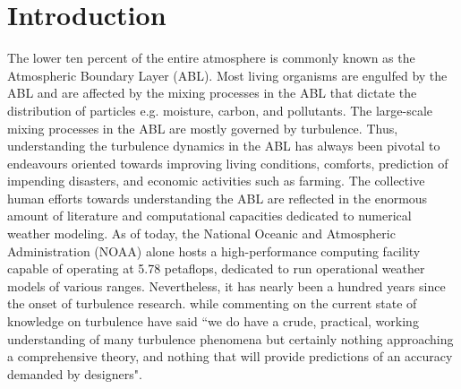 \chapter{Introduction}\label{chap:intro_chap}
The lower ten percent of the entire atmosphere is commonly known as the Atmospheric Boundary Layer (ABL). Most living organisms are engulfed by the ABL and are affected by the mixing processes in the ABL that dictate the distribution of particles e.g. moisture, carbon, and pollutants. The large-scale mixing processes in the ABL are mostly governed by turbulence. Thus, understanding the turbulence dynamics in the ABL has always been pivotal to endeavours oriented towards improving living conditions, comforts, prediction of impending disasters, and economic activities such as farming. The collective human efforts towards understanding the ABL are reflected in the enormous amount of literature and computational capacities dedicated to numerical weather modeling. As of today, the National Oceanic and Atmospheric Administration (NOAA) alone hosts a high-performance computing facility capable of operating at 5.78 petaflops, dedicated to run operational weather models of various ranges. Nevertheless, it has nearly been a hundred years since the onset of turbulence research. \citet{lumely_yaglom_FTC_2001}  while commenting on the current state of knowledge on turbulence have said ``we do have a crude, practical, working understanding of many turbulence phenomena but certainly nothing approaching a comprehensive theory, and nothing that will provide predictions of an accuracy demanded by designers". 


